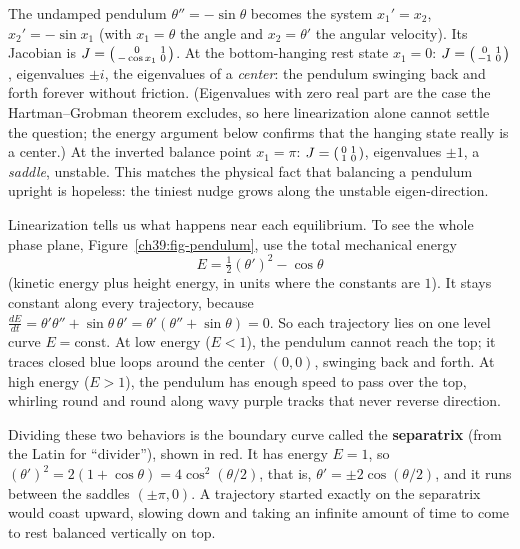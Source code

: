 \begin{example}
\label{ch39:ex-pendulum}
The undamped pendulum $\theta'' = -\sin\theta$ becomes the system $x_1' = x_2$,
$x_2' = -\sin x_1$ (with $x_1=\theta$ the angle and $x_2 = \theta'$ the angular
velocity). Its Jacobian is $J = \begin{psmallmatrix} 0 & 1 \\ -\cos x_1 &
0\end{psmallmatrix}$. At the bottom-hanging rest state $x_1 = 0$:
$J = \begin{psmallmatrix} 0 & 1 \\ -1 & 0\end{psmallmatrix}$, eigenvalues
$\pm i$, the eigenvalues of a \emph{center}: the pendulum swinging back and forth forever without
friction. (Eigenvalues with zero real part are the case the Hartman--Grobman
theorem excludes, so here linearization alone cannot settle the question; the
energy argument below confirms that the hanging state really is a center.)
At the inverted balance point $x_1 = \pi$:
$J = \begin{psmallmatrix} 0 & 1 \\ 1 & 0\end{psmallmatrix}$, eigenvalues
$\pm 1$, a \emph{saddle}, unstable. This matches the physical fact that
balancing a pendulum upright is hopeless: the tiniest nudge grows along the
unstable eigen-direction.

Linearization tells us what happens near each equilibrium. To see the whole
phase plane, Figure~\ref{ch39:fig-pendulum}, use the total mechanical energy
\[
  E = \tfrac{1}{2}(\theta')^2 - \cos\theta
\]
(kinetic energy plus height energy, in units where the constants are $1$). It
stays constant along every trajectory, because
$\frac{dE}{dt} = \theta'\theta'' + \sin\theta\,\theta' = \theta'(\theta''+\sin\theta) = 0$.
So each trajectory lies on one level curve $E = \text{const}$.
At low energy ($E < 1$), the pendulum cannot reach the top; it
traces closed blue loops around the center
$(0,0)$, swinging back and forth. At high energy ($E > 1$), the pendulum has
enough speed to pass over the top, whirling round and round along wavy purple tracks that
never reverse direction.

Dividing these two behaviors is the boundary curve called the
\textbf{separatrix} (from the Latin for ``divider''), shown in red. It
has energy $E=1$, so $(\theta')^2 = 2(1+\cos\theta) = 4\cos^2(\theta/2)$, that is,
$\theta' = \pm 2\cos(\theta/2)$, and it runs between the saddles
$(\pm\pi, 0)$. A trajectory started exactly
on the separatrix would coast upward, slowing down and taking an
infinite amount of time to come to rest balanced vertically on top.
\end{example}

